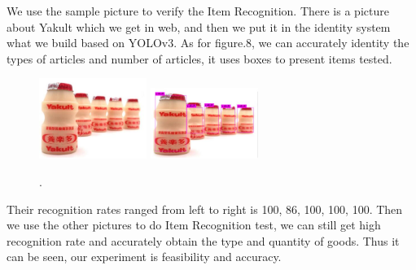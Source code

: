 We use the sample picture to verify the Item Recognition. There is a picture about Yakult which we get in web, and then we put it in the identity system what we build based on YOLOv3\cite{yolov3}. As for figure.8, we can accurately identity the types of articles and number of articles, it uses boxes to present items tested.
\begin{figure}[htbp]
\centerline{\includegraphics[width=3.5cm,scale=0.6]{Yakult.jpg} \includegraphics[width=3.5cm,scale=0.6]{Yakult_new.jpg}}
\caption{.}
\label{fig}
\end{figure}

Their recognition rates ranged from left to right is 100, 86, 100, 100, 100. Then we use the other pictures to do Item Recognition test, we can still get high recognition rate and accurately obtain the type and quantity of goods. Thus it can be seen, our experiment is feasibility and accuracy.
